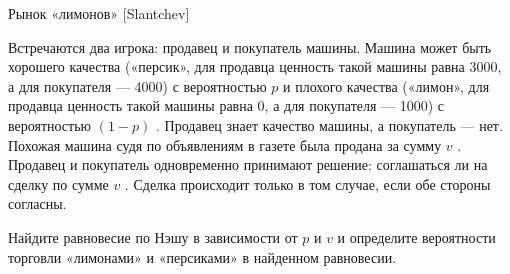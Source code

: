 \begin{problem}
 Рынок «лимонов» [Slantchev]\par
Встречаются два игрока: продавец и покупатель машины. Машина может быть хорошего качества («персик», для продавца ценность такой машины равна 3000, а для покупателя — 4000) с вероятностью  $p$  и плохого качества («лимон», для продавца ценность такой машины равна 0, а для покупателя — 1000) с вероятностью  $\left(1-p\right)$ . Продавец знает качество машины, а покупатель — нет. Похожая машина судя по объявлениям в газете была продана за сумму  $v$ . Продавец и покупатель одновременно принимают решение: соглашаться ли на сделку по сумме  $v$ . Сделка происходит только в том случае, если обе стороны согласны.\par
Найдите равновесие по Нэшу в зависимости от  $p$  и  $v$  и определите вероятности торговли «лимонами» и «персиками» в найденном равновесии.



\begin{sol}

\end{sol}
\end{problem}



